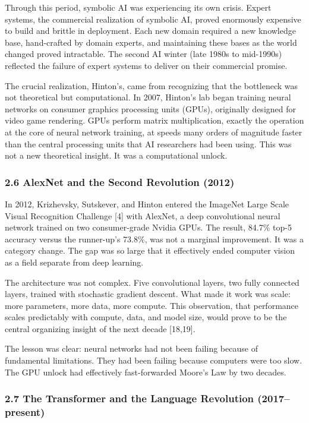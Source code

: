 \documentclass[
  11pt,
  letterpaper,
]{article}
\begin{document}
Through this period, symbolic AI was experiencing its own crisis. Expert
systems, the commercial realization of symbolic AI, proved enormously
expensive to build and brittle in deployment. Each new domain required a
new knowledge base, hand-crafted by domain experts, and maintaining
these bases as the world changed proved intractable. The second AI
winter (late 1980s to mid-1990s) reflected the failure of expert systems
to deliver on their commercial promise.

The crucial realization, Hinton's, came from recognizing that the
bottleneck was not theoretical but computational. In 2007, Hinton's lab
began training neural networks on consumer graphics processing units
(GPUs), originally designed for video game rendering. GPUs perform
matrix multiplication, exactly the operation at the core of neural
network training, at speeds many orders of magnitude faster than the
central processing units that AI researchers had been using. This was
not a new theoretical insight. It was a computational unlock.

\subsubsection{2.6 AlexNet and the Second Revolution
(2012)}\label{alexnet-and-the-second-revolution-2012}

In 2012, Krizhevsky, Sutskever, and Hinton entered the ImageNet Large
Scale Visual Recognition Challenge {[}4{]} with AlexNet, a deep
convolutional neural network trained on two consumer-grade Nvidia GPUs.
The result, 84.7\% top-5 accuracy versus the runner-up's 73.8\%, was not
a marginal improvement. It was a category change. The gap was so large
that it effectively ended computer vision as a field separate from deep
learning.

The architecture was not complex. Five convolutional layers, two fully
connected layers, trained with stochastic gradient descent. What made it
work was scale: more parameters, more data, more compute. This
observation, that performance scales predictably with compute, data, and
model size, would prove to be the central organizing insight of the next
decade {[}18,19{]}.

The lesson was clear: neural networks had not been failing because of
fundamental limitations. They had been failing because computers were
too slow. The GPU unlock had effectively fast-forwarded Moore's Law by
two decades.

\subsubsection{2.7 The Transformer and the Language Revolution
(2017--present)}\label{the-transformer-and-the-language-revolution-2017present}
\end{document}

